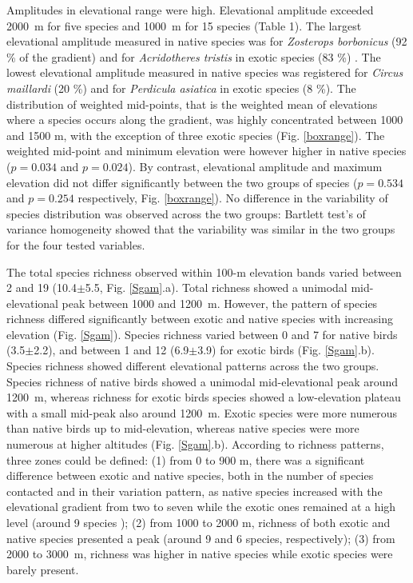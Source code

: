 \documentclass{article}\usepackage[]{graphicx}\usepackage[]{color}
\begin{document}
Amplitudes in elevational range were high. Elevational amplitude exceeded 2000~m for five species and 1000~m for 15 species (Table 1). The largest elevational amplitude measured in native species was for \textit{Zosterops borbonicus} (92 \% of the gradient) and for \textit{Acridotheres tristis} in exotic species (83 \%) . The lowest elevational amplitude measured in native species was registered for \textit{Circus maillardi} (20 \%) and for \textit{Perdicula asiatica} in exotic species (8 \%). The distribution of weighted mid-points, that is the weighted mean of elevations where a species occurs along the gradient, was highly concentrated between 1000 and 1500 m, with the exception of three exotic species (Fig. \ref{boxrange}). The weighted mid-point and minimum elevation were however higher in native species ($p=0.034$ and $p=0.024$). By contrast, elevational amplitude and maximum elevation did not differ significantly between the two groups of species ($p=0.534$ and $p=0.254$ respectively, Fig. \ref{boxrange}). No difference in the variability of species distribution was observed across the two groups: Bartlett test's of variance homogeneity showed that the variability was similar in the two groups for the four tested variables.

The total species richness observed within 100-m elevation bands varied between 2 and 19 (10.4$\pm$5.5, Fig. \ref{Sgam}.a). Total richness showed a unimodal mid-elevational peak between 1000 and 1200~m. However, the pattern of species richness differed significantly between exotic and native species with increasing elevation (Fig. \ref{Sgam}). Species richness varied between 0 and 7 for native birds (3.5$\pm$2.2), and between 1 and 12 (6.9$\pm$3.9) for exotic birds (Fig. \ref{Sgam}.b). Species richness showed different elevational patterns across the two groups. Species richness of native birds showed a unimodal mid-elevational peak around 1200~m, whereas richness for exotic birds species showed a low-elevation plateau with a small mid-peak also around 1200~m. Exotic species were more numerous than native birds up to mid-elevation, whereas native species were more numerous at higher altitudes (Fig. \ref{Sgam}.b). According to richness patterns, three zones could be defined: (1) from 0 to 900 m, there was a significant difference between exotic and native species, both in the number of species contacted and in their variation pattern, as native species increased with the elevational gradient from two to seven while the exotic ones remained at a high level (around 9 species ); (2) from 1000 to 2000 m, richness of both exotic and native species presented a peak (around 9 and 6 species, respectively); (3) from 2000 to 3000~m, richness was higher in native species while exotic species were barely present. 
\end{document}
